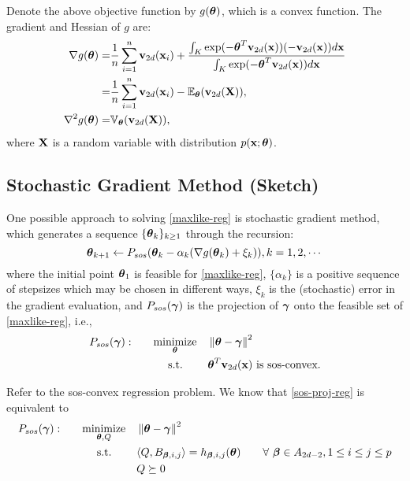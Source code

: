 \documentclass[11pt]{article}
\begin{document}
Denote the above objective function by $g({\boldsymbol\theta})$, which is a convex function. The gradient and Hessian of $g$ are:
\begin{align}
\nabla g({\boldsymbol\theta}) =& \frac{1}{n} \sum_{i = 1}^n {\bf v}_{2d}({\bf x}_i) + \frac{\int_ K\exp (-{\boldsymbol\theta}^T{\bf v}_{2d}({\bf x})) (-{\bf v}_{2d}({\bf x}) )d{\bf x} }{\int_K \exp (-{\boldsymbol\theta}^T{\bf v}_{2d}({\bf x})) d{\bf x}}\notag\\
=& \frac{1}{n} \sum_{i = 1}^n {\bf v}_{2d}({\bf x}_i) - \mathbb E_{\boldsymbol\theta} ({\bf v}_{2d}({\bf X})),\label{neg-loglike-gradient}\\
\nabla^2 g({\boldsymbol\theta}) =& \mathbb V_{\boldsymbol\theta} ({\bf v}_{2d}({\bf X})), \label{neg-loglike-hessian}
\end{align}
where ${\bf X}$ is a random variable with distribution $p({\bf x}; {\boldsymbol\theta})$.

\subsection{Stochastic Gradient Method (Sketch)}


One possible approach to solving \eqref{maxlike-reg} is stochastic gradient method, which generates a sequence $\{{\boldsymbol\theta}_k\}_{k \ge 1}$ through the recursion:
\begin{equation} \label{gpa-recursion}
{\boldsymbol\theta}_{k + 1} \leftarrow P_{sos} ({\boldsymbol\theta}_k - \alpha_k (\nabla g({\boldsymbol\theta}_k) + \xi_k) ), k = 1, 2, \cdots
\end{equation}
where the initial point ${\boldsymbol\theta}_1$ is feasible for \eqref{maxlike-reg}, $\{\alpha_k\}$ is a positive sequence of stepsizes which may be chosen in different ways, $\xi_k$ is the (stochastic) error in the gradient evaluation, and $P_{sos}({\boldsymbol\gamma})$ is the projection of ${\boldsymbol\gamma}$ onto the feasible set of \eqref{maxlike-reg}, i.e.,
\begin{equation} \label{sos-proj-reg}
\begin{aligned}
 P_{sos}({\boldsymbol\gamma}): \qquad & \underset{{\boldsymbol\theta}}{\text{minimize} }
& & \left\lVert {\boldsymbol\theta} - {\boldsymbol\gamma} \right\rVert^2 \\
& \text{\quad\ s.t.}
& & \text{${\boldsymbol\theta}^T {\bf v}_{2d}({\bf x})$ is sos-convex.}
\end{aligned}
\end{equation}

Refer to the sos-convex regression problem. We know that \eqref{sos-proj-reg} is equivalent to
\begin{equation} \label{sos-proj-reg2}
\begin{aligned}
 P_{sos}({\boldsymbol\gamma}): \qquad & \underset{{\boldsymbol\theta}, Q}{\text{minimize} }
& & \left\lVert {\boldsymbol\theta} - {\boldsymbol\gamma} \right\rVert^2 \\
& \text{\quad\ s.t.}
& & \langle{Q, B_{{\boldsymbol\beta}, i, j}} \rangle = h_{{\boldsymbol\beta}, i, j}({\boldsymbol\theta}) \qquad \forall\ {\boldsymbol\beta} \in A_{2d - 2}, 1 \le i \le j \le p \\
& & & Q \succeq 0 
\end{aligned}
\end{equation}
\end{document}
